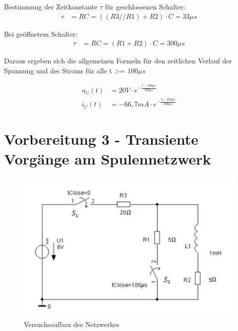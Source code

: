 \documentclass{article}
\begin{document}
Bestimmung der Zeitkonstante $\tau$ für geschlossenen Schalter:
\begin{align*}
  \tau &= RC = ((R3 // R1) + R2) \cdot C = 33\mu s
\end{align*}

Bei geöffnetem Schalter:
\begin{align*}
  \tau &= RC = (R1 + R2) \cdot C = 300\mu s
\end{align*}

Daraus ergeben sich die allgemeinen Formeln für den zeitlichen Verlauf der Spannung und des Stroms für alle t >= $100\mu s$

\begin{align*}
  u_C(t)&= 20V \cdot e^{-\frac{t-100\mu s}{300\mu s}}\\
  i_C(t)&= -66,7mA \cdot e^{-\frac{t-100\mu s}{300\mu s}}
\end{align*}

\newpage

\section{Vorbereitung 3 - Transiente Vorgänge am Spulennetzwerk}

\begin{figure}[h]
  \begin{center}
    \includegraphics[scale=1]{../assets/images/ET2P5/vorbereitung 3.jpg}
    \caption{Versuchsaufbau des Netzwerkes}
  \end{center}
\end{figure}
\end{document}
